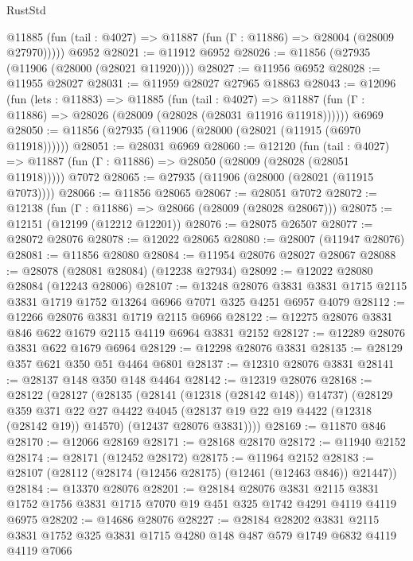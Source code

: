 \begin{lexlean}{RustStd}
\begin{coremodule}
      @11885 (fun (tail : @4027) => @11887 (fun (Γ : @11886) => @28004 (@28009 @27970)))))
    @6952
@28021 := @11912 @6952
@28026 := @11856 (@27935 (@11906 (@28000 (@28021 @11920))))
@28027 := @11956 @6952
@28028 := @11955 @28027
@28031 := @11959 @28027 @27965 @18863
@28043 := @12096
    (fun (lets : @11883) =>
    @11885
      (fun (tail : @4027) =>
      @11887 (fun (Γ : @11886) => @28026 (@28009 (@28028 (@28031 @11916 @11918))))))
    @6969
@28050 := @11856 (@27935 (@11906 (@28000 (@28021 (@11915 (@6970 @11918))))))
@28051 := @28031 @6969
@28060 := @12120
    (fun (tail : @4027) => @11887 (fun (Γ : @11886) => @28050 (@28009 (@28028 (@28051 @11918)))))
    @7072
@28065 := @27935 (@11906 (@28000 (@28021 (@11915 @7073))))
@28066 := @11856 @28065
@28067 := @28051 @7072
@28072 := @12138 (fun (Γ : @11886) => @28066 (@28009 (@28028 @28067)))
@28075 := @12151 (@12199 (@12212 @12201))
@28076 := @28075 @26507
@28077 := @28072 @28076
@28078 := @12022 @28065
@28080 := @28007 (@11947 @28076)
@28081 := @11856 @28080
@28084 := @11954 @28076 @28027 @28067
@28088 := @28078 (@28081 @28084) (@12238 @27934)
@28092 := @12022 @28080 @28084 (@12243 @28006)
@28107 := @13248
    @28076
    @3831
    @3831
    @1715
    @2115
    @3831
    @1719
    @1752
    @13264
    @6966
    @7071
    @325
    @4251
    @6957
    @4079
@28112 := @12266 @28076 @3831 @1719 @2115 @6966
@28122 := @12275 @28076 @3831 @846 @622 @1679 @2115 @4119 @6964 @3831 @2152
@28127 := @12289 @28076 @3831 @622 @1679 @6964
@28129 := @12298 @28076 @3831
@28135 := @28129 @357 @621 @350 @51 @4464 @6801
@28137 := @12310 @28076 @3831
@28141 := @28137 @148 @350 @148 @4464
@28142 := @12319 @28076
@28168 := @28122
    (@28127
      (@28135
        (@28141 (@12318 (@28142 @148)) @14737)
        (@28129
          @359
          @371
          @22
          @27
          @4422
          @4045
          (@28137 @19 @22 @19 @4422 (@12318 (@28142 @19)) @14570)
          (@12437 @28076 @3831))))
@28169 := @11870 @846
@28170 := @12066 @28169
@28171 := @28168 @28170
@28172 := @11940 @2152
@28174 := @28171 (@12452 @28172)
@28175 := @11964 @2152
@28183 := @28107 (@28112 (@28174 (@12456 @28175) (@12461 (@12463 @846)) @21447))
@28184 := @13370 @28076
@28201 := @28184
    @28076
    @3831
    @2115
    @3831
    @1752
    @1756
    @3831
    @1715
    @7070
    @19
    @451
    @325
    @1742
    @4291
    @4119
    @4119
    @6975
@28202 := @14686 @28076
@28227 := @28184
    @28202
    @3831
    @2115
    @3831
    @1752
    @325
    @3831
    @1715
    @4280
    @148
    @487
    @579
    @1749
    @6832
    @4119
    @4119
    @7066

\end{coremodule}
\end{lexlean}
